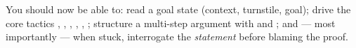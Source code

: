 \begin{checkpoint}
You should now be able to: read a goal state (context, turnstile, goal);
drive the core tactics , , ,
, , ; structure a multi-step argument
with  and ; and --- most importantly --- when stuck,
interrogate the \emph{statement} before blaming the proof.
\end{checkpoint}
